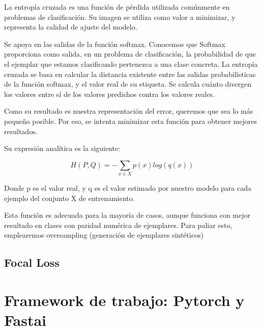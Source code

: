 La entropía cruzada es una función de pérdida utilizada comúnmente en problemas de clasificación. Su imagen se utiliza como valor a minimizar, y representa la calidad de ajuste del modelo.

Se apoya en las salidas de la función softmax. Conocemos que Softmax proporciona como salida, en un problema de clasificación, la probabilidad de que el ejemplar que estamos clasificando pertenezca a una clase concreta. La entropía cruzada se basa en calcular la distancia existente entre las salidas probabilísticas de la función softmax, y el valor real de su etiqueta. Se calcula cuánto divergen los valores entre sí de los valores predichos contra los valores reales.

Como su resultado es nuestra representación del error, queremos que sea lo más pequeño posible. Por eso, se intenta minimizar esta función para obtener mejores resultados.

Su expresión analítica es la siguiente:

$$H(P,Q)= -\sum_{x \in X}p(x)log(q(x))$$

Donde p es el valor real, y q es el valor estimado por nuestro modelo para cada ejemplo del conjunto X de entrenamiento.

Esta función es adecuada para la mayoría de casos, aunque funciona con mejor resultado en clases con paridad numérica de ejemplares. Para paliar esto, emplearemos oversampling (generación de ejemplares sintéticos)

\subsection{Focal Loss}

\section{Framework de trabajo: Pytorch y Fastai}
